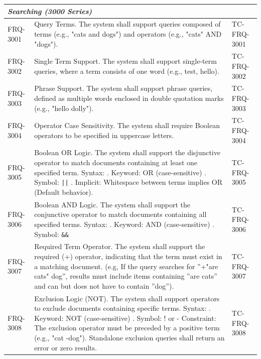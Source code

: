 \documentclass{article}
\begin{document}
\begin{longtable}{@{}p{1.7cm} p{9cm} p{4.5cm}@{}}
\midrule
\multicolumn{3}{l}{\textbf{\textit{Searching (3000 Series)}}} \\
\midrule
FRQ-3001 & Query Terms. The system shall support queries composed of terms (e.g., "cats and dogs") and operators (e.g., "cats" AND "dogs").& TC-FRQ-3001\\
FRQ-3002 & Single Term Support. The system shall support single-term queries, where a term consists of one word (e.g., test, hello).& TC-FRQ-3002\\
FRQ-3003 & Phrase Support. The system shall support phrase queries, defined as multiple words enclosed in double quotation marks (e.g., "hello dolly").& TC-FRQ-3003\\

FRQ-3004 & Operator Case Sensitivity. The system shall require Boolean operators to be specified in uppercase letters. & TC-FRQ-3004 \\

FRQ-3005 & Boolean OR Logic. The system shall support the disjunctive operator to match documents containing at least one specified term. \newline
Syntax: \newline
1. Keyword: OR (case-sensitive) \newline
2. Symbol: \texttt{||} \newline
3. Implicit: Whitespace between terms implies OR (Default behavior).& TC-FRQ-3005 \\

FRQ-3006 & Boolean AND Logic. The system shall support the conjunctive operator to match documents containing all specified terms.
Syntax: \newline
1. Keyword: AND (case-sensitive) \newline
2. Symbol: \texttt{\&\&} & TC-FRQ-3006 \\



FRQ-3007 & Required Term Operator. The system shall support the required (+) operator, indicating that the term must exist in a matching document. \newline
            (e.g, If the query searches for ”+"are cats" dog”, results must include items containing ”are cats” and can but does not have to contain ”dog”). & TC-FRQ-3007\\

FRQ-3008 & Exclusion Logic (NOT). The system shall support operators to exclude documents containing specific terms. \newline
Syntax: \newline
1. Keyword: NOT (case-sensitive) \newline
2. Symbol: ! or - \newline
Constraint: The exclusion operator must be preceded by a positive term (e.g., "cat -dog"). Standalone exclusion queries shall return an error or zero results. & TC-FRQ-3008 \\


\end{longtable}
\end{document}

